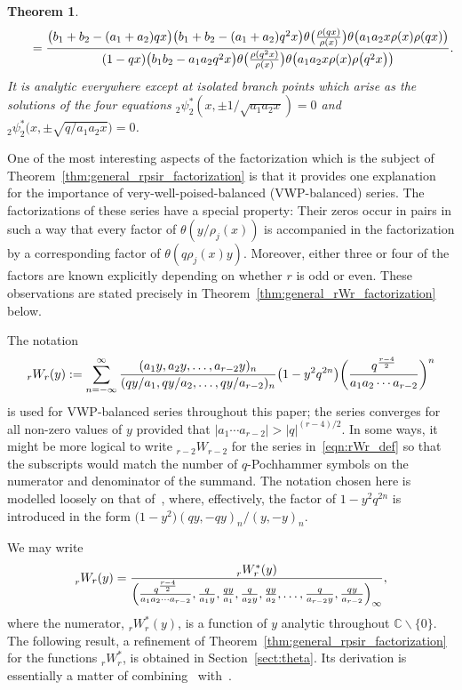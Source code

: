 \documentclass[pdftex]{sigma}
\numberwithin{equation}{section}
\newtheorem{Theorem}{Theorem}[section]
\newcommand{\C}{\mathbb{C}}
\begin{document}
\begin{Theorem}
\begin{gather}
\qquad= {\bigl(b_1+b_2-(a_1+a_2)qx\bigr) \bigl(b_1+b_2-(a_1+a_2)q^2x\bigr) \theta\bigl({\rho(qx) \over \rho(x)}\bigr) \theta\bigl(a_1a_2x\rho(x)\rho(qx)\bigr)\over (1-qx)\bigl(b_1b_2-a_1a_2q^2x\bigr) \theta\bigl({\rho(q^2x) \over \rho(x)}\bigr) \theta\bigl(a_1a_2x\rho(x)\rho\bigl(q^2x\bigr)\bigr)}. \label{eqn:rho_functional_equation}
\end{gather}
It is analytic everywhere except at isolated branch points which arise as the solutions of the four equations $_2^{}\psi_2^\ast(x,\pm 1/\sqrt{a_1a_2x})=0$ and $_2^{}\psi_2^\ast\bigl(x,\pm \sqrt{q/a_1a_2x}\bigr)=0$.
\end{Theorem}

One of the most interesting aspects of the factorization which is the subject of Theorem~\ref{thm:general_rpsir_factorization} is that it provides one explanation for the importance of very-well-poised-balanced (VWP-balanced) series. The factorizations of these series have a special property: Their zeros occur in pairs in such a way that every factor of $\theta(y/\rho_j(x))$ is accompanied in the factorization by a corresponding factor of $\theta(q\rho_j(x)y)$. Moreover, either three or four of the factors are known explicitly depending on whether $r$ is odd or even. These observations are stated precisely in Theorem~\ref{thm:general_rWr_factorization} below.

The notation
\begin{equation} \label{eqn:rWr_def}
_rW_r(y) := \sum_{n=-\infty}^\infty {(a_1 y, a_2 y, \dots, a_{r-2} y)_n \over (qy/a_1, qy/a_2, \dots, qy/a_{r-2})_n} \bigl(1-y^2q^{2n}\bigr) \bigg({q^{r-4 \over 2} \over a_1a_2 \cdots a_{r-2}}\bigg)^{ n}
\end{equation}
is used for VWP-balanced series throughout this paper; the series converges for all non-zero values of $y$ provided that $|a_1\cdots a_{r-2}|>|q|^{(r-4)/2}$. In some ways, it might be more logical to write $_{r-2}W_{r-2}$ for the series in~\eqref{eqn:rWr_def} so that the subscripts would match the number of $q$-Pochhammer symbols on the numerator and denominator of the summand. The notation chosen here is modelled loosely on that of~\cite[Section~2.1]{Gasper2004}, where, effectively, the factor of $1-y^2q^{2n}$ is introduced in the form $\bigl(1-y^2\bigr)(qy,-qy)_n/(y,-y)_n$.

We may write
\begin{equation} \label{eqn:rWrast_def}
_r^{}W_r(y) = {_r^{}W_r^\ast(y) \over \Bigl({q^{r-4 \over 2} \over a_1a_2\cdots a_{r-2}}, {q \over a_1 y}, {qy \over a_1}, {q \over a_2 y}, {qy \over a_2}, \dots, {q \over a_{r-2} y}, {qy \over a_{r-2}}\Bigr)_{ \infty}},
\end{equation}
where the numerator, $_r^{}W_r^\ast(y)$, is a function of $y$ analytic throughout $\C \backslash \{0\}$. The following result, a refinement of Theorem~\ref{thm:general_rpsir_factorization} for the functions $_r^{}W_r^\ast$, is obtained in Section~\ref{sect:theta}. Its derivation is essentially a matter of combining~\cite[Lemma~4.5]{Ito2008} with~\cite[Proposition~3.4]{Rosengren2006}.
\end{document}
